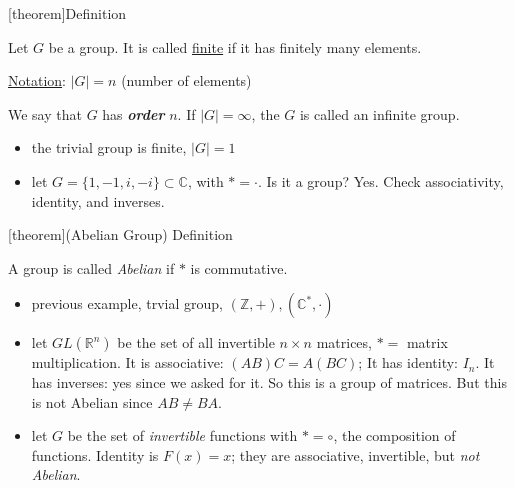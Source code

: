 \documentclass[12pt]{report}
\theoremstyle{definition}
\begin{document}
[theorem]{Definition}
\begin{finite group}
    Let $G$ be a group. It is called \underline{finite} if it has finitely many elements.
    
    \underline{Notation}: $|G| = n$ (number of elements)
    
    We say that $G$ has \textbf{\emph{order}} $n$.  
    If $|G| = \infty$, the $G$ is called an infinite group.
\end{finite group}

\begin{ex}
    \;

    \begin{itemize}
        \item the trivial group is finite, $|G| = 1$
        \item let $G = \{1, -1, i, -i\} \subset \mathbb{C}$, with $* = \cdot$.
            Is it a group? Yes. Check associativity, identity, and inverses.
    \end{itemize}
    
\end{ex}

[theorem]{(Abelian Group) Definition}
\begin{abelian group}
    A group is called \emph{Abelian} if $*$ is commutative.
\end{abelian group}

\begin{ex}
    \;

    \begin{itemize}
            \item previous example, trvial group, $(\mathbb{Z}, +), (\mathbb{C}^{*}, \cdot)$
            \item let $GL(\mathbb{R}^{n})$ be the set of all invertible $n \times n$ matrices, $* = $ matrix multiplication.
                It is associative: $(AB)C = A(BC)$;
                It has identity: $I_n$.
                It has inverses: yes since we asked for it.
                So this is a group of matrices.
                But this is not Abelian since $AB \neq BA$.
            \item let $G$ be the set of \emph{invertible} functions with $* = \circ$, the composition of functions.
                Identity is $F(x) = x$; they are associative, invertible, but \emph{not Abelian}.
    \end{itemize}
    
\end{ex}
\end{document}
